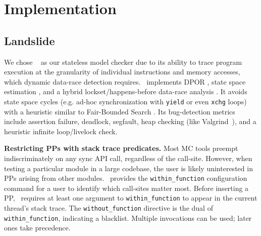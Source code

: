 \section{Implementation}
\label{sec:implementation}

\subsection{Landslide}
\label{sec:landslide}

We chose \landslide~\cite{landslide} as our stateless model checker due to its ability to trace program execution at the granularity of individual instructions and memory accesses, which dynamic data-race detection requires.
\landslide~implements DPOR \cite{dpor},
state space estimation \cite{estimation}, and a hybrid lockset/happens-before data-race analysis \cite{hybriddatarace}.
It avoids state space cycles (e.g. ad-hoc synchronization with {\tt yield} or even {\tt xchg} loops) with a heuristic similar to Fair-Bounded Search \cite{bpor}.
Its bug-detection metrics include assertion failure, deadlock, segfault, heap checking (like Valgrind~\cite{valgrind}), and a heuristic infinite loop/livelock check.

{\bf Restricting PPs with stack trace predicates.}
Most MC tools preempt indiscriminately on any sync API call, regardless of the call-site.
However, when testing a particular module in a large codebase,
the user is likely uninterested in PPs arising from other modules.
\landslide~provides the {\tt within\_function} configuration command for a user to identify which call-sites matter most.
Before inserting a PP, \landslide~requires at least one argument to {\tt within\_function} to appear in the current thread's stack trace.
The {\tt without\_function} directive is the dual of {\tt within\_function}, indicating a blacklist.
Multiple invocations can be used; later ones take precedence.

